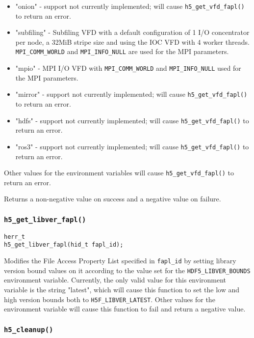 \documentclass[../HDF5_RFC.tex]{subfiles}
\begin{document}
\begin{itemize}
    \item "onion" - support not currently implemented; will cause \texttt{h5\_get\_vfd\_fapl()} to return an
          error.
    \item "subfiling" - Subfiling VFD with a default configuration of 1 I/O concentrator per node, a 32MiB
          stripe size and using the IOC VFD with 4 worker threads. \texttt{MPI\_COMM\_WORLD} and
          \texttt{MPI\_INFO\_NULL} are used for the MPI parameters.
    \item "mpio" - MPI I/O VFD with \texttt{MPI\_COMM\_WORLD} and \texttt{MPI\_INFO\_NULL} used for the MPI
          parameters.
    \item "mirror" - support not currently implemented; will cause \texttt{h5\_get\_vfd\_fapl()} to return an
          error.
    \item "hdfs" - support not currently implemented; will cause \texttt{h5\_get\_vfd\_fapl()} to return an
          error.
    \item "ros3" - support not currently implemented; will cause \texttt{h5\_get\_vfd\_fapl()} to return an
          error.

\end{itemize}

Other values for the environment variables will cause \texttt{h5\_get\_vfd\_fapl()} to return an error.

Returns a non-negative value on success and a negative value on failure.

\subsubsection{\texttt{h5\_get\_libver\_fapl()}}

\begin{verbatim}
herr_t
h5_get_libver_fapl(hid_t fapl_id);
\end{verbatim}

Modifies the File Access Property List specified in \texttt{fapl\_id} by setting library version bound
values on it according to the value set for the \texttt{HDF5\_LIBVER\_BOUNDS} environment variable.
Currently, the only valid value for this environment variable is the string "latest", which will cause
this function to set the low and high version bounds both to \texttt{H5F\_LIBVER\_LATEST}. Other values
for the environment variable will cause this function to fail and return a negative value.

\subsubsection{\texttt{h5\_cleanup()}}
\label{apdx:h5test_h5cleanup}
\end{document}
